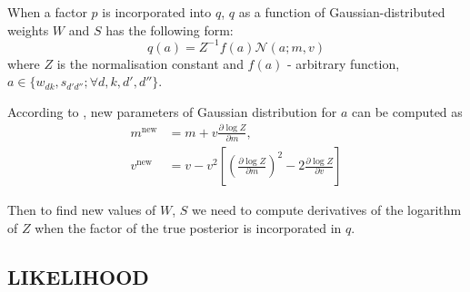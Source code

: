 \documentclass[letterpaper]{article}
\begin{document}
When a factor $p$ is incorporated into $q$, $q$ as a function of Gaussian-distributed weights $W$  and $S$ has the following form:
\begin{equation}
q(a) = Z^{-1}f(a)\mathcal{N}(a; m, v)
\end{equation}
where $Z$ is the normalisation constant and $f(a)$ - arbitrary function, $a \in \{w_{dk}, s_{d'd''}; \forall d, k, d', d''\}$.

According to \cite{minka2001thesis}, new parameters of Gaussian distribution for $a$ can be computed as
\begin{align}
m^{\text{new}} &= m + v \frac{\partial \log Z}{\partial m}, \\
v^{\text{new}} &= v - v^2\left[ \left(\frac{\partial \log Z}{\partial m}\right)^2 - 2 \frac{\partial \log Z}{\partial v}\right]
\end{align}

Then to find new values of $W$, $S$ we need to compute derivatives of the logarithm of $Z$ when the factor of the true posterior is incorporated in $q$.

\subsection{\uppercase{Likelihood}}
\end{document}

